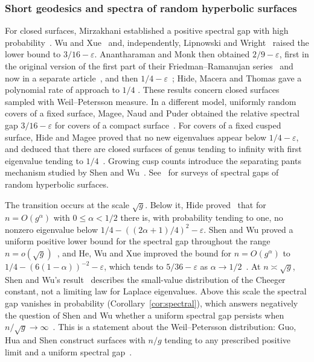 \subsubsection{Short geodesics and spectra of random hyperbolic surfaces}
For closed surfaces, Mirzakhani established a positive spectral gap
with high probability~\cite[Section~4.5]{Mir}. Wu and Xue~\cite{WX} and,
independently, Lipnowski and Wright~\cite{LipWright} raised the lower
bound to $3/16-\varepsilon$. Anantharaman and Monk then obtained
$2/9-\varepsilon$, first in the original version of the first part of
their Friedman--Ramanujan series~\cite[Theorem~10.1]{AMPartOne} and now
in a separate article~\cite{AMTwoNinths}, and then
$1/4-\varepsilon$~\cite[Theorem~1.6]{AMGap};
Hide, Macera and Thomas gave a polynomial rate of approach to $1/4$
\cite{HMT}. These results concern closed surfaces sampled with
Weil--Petersson measure. In a different model, uniformly random
covers of a fixed surface, Magee, Naud and Puder obtained the relative
spectral gap $3/16-\varepsilon$ for covers of a compact
surface~\cite{MNP}. For covers of a fixed cusped surface, Hide and Magee
proved that no new eigenvalues appear below $1/4-\varepsilon$, and
deduced that there are closed surfaces of genus tending to infinity with
first eigenvalue tending to $1/4$~\cite{HideMagee}. Growing cusp counts introduce the separating
pants mechanism studied by Shen and Wu~\cite{SW}. See~\cite{MonkNaud,Petri}
for surveys of spectral gaps of random hyperbolic surfaces.

The transition occurs at the scale $\sqrt g$. Below it, Hide proved~\cite[Theorem~1.3]{Hide}
that for $n=O(g^\alpha)$ with $0\le\alpha<1/2$ there is, with
probability tending to one, no nonzero eigenvalue below
$1/4-((2\alpha+1)/4)^2-\varepsilon$. Shen and Wu proved a
uniform positive lower bound for the spectral gap throughout the range
$n=o(\sqrt g)$~\cite[Theorem~3]{SW}, and He, Wu and Xue improved the
bound for $n=O(g^\alpha)$ to $1/4-(6(1-\alpha))^{-2}-\varepsilon$,
which tends to $5/36-\varepsilon$ as $\alpha\to1/2$~\cite[Theorem~1.2]{HWX}. At
$n\asymp\sqrt g$, Shen and Wu's result~\cite[Theorem~2]{SW} describes the small-value
distribution of the Cheeger constant, not a limiting law for Laplace
eigenvalues. Above this scale the spectral gap vanishes in probability
(Corollary~\ref{cor:spectral}), which answers negatively the question
of Shen and Wu whether a uniform spectral gap persists when
$n/\sqrt g\to\infty$~\cite[Question~2]{SW}.
This is a statement about the Weil--Petersson distribution: Guo, Hua
and Shen construct surfaces with $n/g$ tending to any prescribed
positive limit and a uniform spectral gap~\cite{GHS}.

